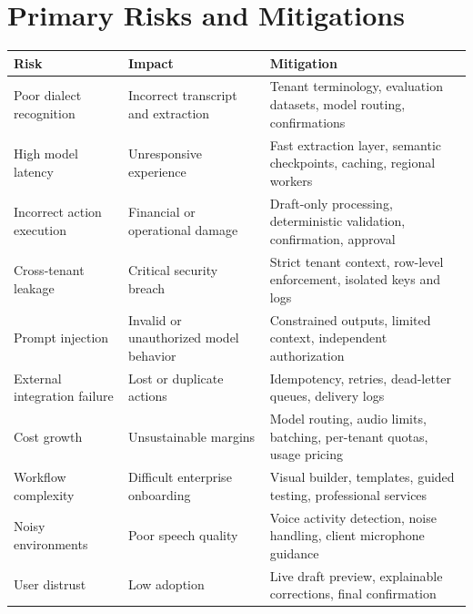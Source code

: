 \documentclass[11pt,a4paper]{article}
\begin{document}
\section{Primary Risks and Mitigations}

\begin{longtable}{L{45mm}L{61mm}L{55mm}}
\toprule
\textbf{Risk} & \textbf{Impact} & \textbf{Mitigation} \\
\midrule
\endhead

Poor dialect recognition
& Incorrect transcript and extraction
& Tenant terminology, evaluation datasets, model routing, confirmations \\

High model latency
& Unresponsive experience
& Fast extraction layer, semantic checkpoints, caching, regional workers \\

Incorrect action execution
& Financial or operational damage
& Draft-only processing, deterministic validation, confirmation, approval \\

Cross-tenant leakage
& Critical security breach
& Strict tenant context, row-level enforcement, isolated keys and logs \\

Prompt injection
& Invalid or unauthorized model behavior
& Constrained outputs, limited context, independent authorization \\

External integration failure
& Lost or duplicate actions
& Idempotency, retries, dead-letter queues, delivery logs \\

Cost growth
& Unsustainable margins
& Model routing, audio limits, batching, per-tenant quotas, usage pricing \\

Workflow complexity
& Difficult enterprise onboarding
& Visual builder, templates, guided testing, professional services \\

Noisy environments
& Poor speech quality
& Voice activity detection, noise handling, client microphone guidance \\

User distrust
& Low adoption
& Live draft preview, explainable corrections, final confirmation \\
\bottomrule
\end{longtable}
\end{document}
